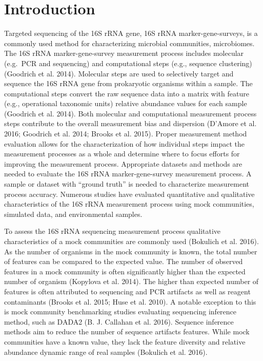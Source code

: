 \documentclass[smallextended]{svjour3}       %
\begin{document}
\begin{abstract}
\end{abstract}


\def\spacingset#1{\renewcommand{\baselinestretch}%
{#1}\small\normalsize} \spacingset{1}


\hypertarget{intro}{%
\section{Introduction}\label{intro}}

Targeted sequencing of the 16S rRNA gene, 16S rRNA marker-gene-surveys,
is a commonly used method for characterizing microbial communities,
microbiomes. The 16S rRNA marker-gene-survey measurement process
includes molecular (e.g.~PCR and sequencing) and computational steps
(e.g., sequence clustering) (Goodrich et al. 2014). Molecular steps are
used to selectively target and sequence the 16S rRNA gene from
prokaryotic organisms within a sample. The computational steps convert
the raw sequence data into a matrix with feature (e.g., operational
taxonomic units) relative abundance values for each sample (Goodrich et
al. 2014). Both molecular and computational measurement process steps
contribute to the overall measurement bias and dispersion (D'Amore et
al. 2016; Goodrich et al. 2014; Brooks et al. 2015). Proper measurement
method evaluation allows for the characterization of how individual
steps impact the measurement processes as a whole and determine where to
focus efforts for improving the measurement process. Appropriate
datasets and methods are needed to evaluate the 16S rRNA
marker-gene-survey measurement process. A sample or dataset with
``ground truth'' is needed to characterize measurement process accuracy.
Numerous studies have evaluated quantitative and qualitative
characteristics of the 16S rRNA measurement process using mock
communities, simulated data, and environmental samples.

To assess the 16S rRNA sequencing measurement process qualitative
characteristics of a mock communities are commonly used (Bokulich et al.
2016). As the number of organisms in the mock community is known, the
total number of features can be compared to the expected value. The
number of observed features in a mock community is often significantly
higher than the expected number of organism (Kopylova et al. 2014). The
higher than expected number of features is often attributed to
sequencing and PCR artifacts as well as reagent contaminants (Brooks et
al. 2015; Huse et al. 2010). A notable exception to this is mock
community benchmarking studies evaluating sequencing inference method,
such as DADA2 (B. J. Callahan et al. 2016). Sequence inference methods
aim to reduce the number of sequence artifacts features. While mock
communities have a known value, they lack the feature diversity and
relative abundance dynamic range of real samples (Bokulich et al. 2016).
\end{document}
